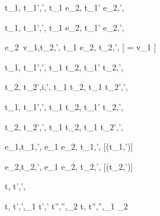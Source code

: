   {t_1,\sigma {} t_1',\sigma',\phi}
  {t_1 \Then e_2,\sigma {} t_1' \Then e_2,\sigma',\phi}

  {t_1,\sigma {} t_1',\sigma',\phi}
  {t_1 \Next e_2,\sigma {} t_1' \Next e_2,\sigma',\phi}

  {e_2\ v_1,\sigma \normalise t_2,\sigma',\phi}
  {t_1 \Next e_2,\sigma \handle{\Continue} t_2,\sigma',\phi}
  [ = v_1 \land \neg{}]


  {t_1,\sigma {} t_1',\sigma',\phi}
  {t_1 \And t_2,\sigma {} t_1' \And t_2,\sigma',\phi}

  {t_2,\sigma {} t_2',i,\sigma',\phi}
  {t_1 \And t_2,\sigma {} t_1 \And t_2',\sigma',\phi}


  {t_1,\sigma {} t_1',\sigma',\phi}
  {t_1 \Or t_2,\sigma {} t_1' \Or t_2,\sigma',\phi}

  {t_2,\sigma {} t_2',\sigma',\phi }
  {t_1 \Or t_2,\sigma {} t_1 \Or t_2',\sigma',\phi}


  {e_1,\sigma \normalise t_1,\sigma',\phi}
  {e_1 \Xor e_2,\sigma \handle{\Left} t_1,\sigma',\phi}
  [\neg\Failing(t_1,\sigma')]

  {e_2,\sigma \normalise t_2,\sigma',\phi}
  {e_1 \Xor e_2,\sigma \handle{\Right} t_2,\sigma',\phi}
  [\neg\Failing(t_2,\sigma')]





  {t,\sigma {} t',\sigma',\phi}


  {t,\sigma {} t',\sigma',\phi_1 \Quad
   t',\sigma' \normalise t'',\sigma'',\phi_2}
  {t,\sigma {} t'',\sigma'',\phi_1 \land \phi_2}
